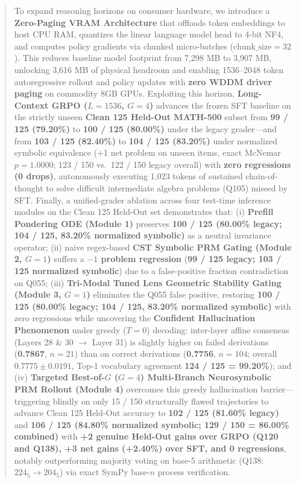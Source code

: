 \documentclass[11pt,a4paper]{article}
\begin{document}
\begin{abstract}
To expand reasoning horizons on consumer hardware, we introduce a \textbf{Zero-Paging VRAM Architecture} that offloads token embeddings to host CPU RAM, quantizes the linear language model head to 4-bit NF4, and computes policy gradients via chunked micro-batches ($\text{chunk\_size}=32$). This reduces baseline model footprint from 7,298 MB to 3,907 MB, unlocking 3,616 MB of physical headroom and enabling 1536--2048 token autoregressive rollout and policy updates with \textbf{zero WDDM driver paging} on commodity 8GB GPUs. Exploiting this horizon, \textbf{Long-Context GRPO ($L=1536$, $G=4$)} advances the frozen SFT baseline on the strictly unseen \textbf{Clean 125 Held-Out MATH-500} subset from \textbf{99 / 125 (79.20\%)} to \textbf{100 / 125 (80.00\%)} under the legacy grader---and from \textbf{103 / 125 (82.40\%)} to \textbf{104 / 125 (83.20\%)} under normalized symbolic equivalence (+1 net problem on unseen items, exact McNemar $p = 1.0000$; 123 / 150 vs.\ 122 / 150 legacy overall) with \textbf{zero regressions (0 drops)}, autonomously executing 1,023 tokens of sustained chain-of-thought to solve difficult intermediate algebra problems (Q105) missed by SFT. Finally, a unified-grader ablation across four test-time inference modules on the Clean 125 Held-Out set demonstrates that: (i) \textbf{Prefill Pondering ODE (Module 1)} preserves \textbf{100 / 125 (80.00\% legacy; 104 / 125, 83.20\% normalized symbolic)} as a neutral invariance operator; (ii) naive regex-based \textbf{CST Symbolic PRM Gating (Module 2, $G=1$)} suffers a \textbf{$-1$ problem regression} (\textbf{99 / 125 legacy; 103 / 125 normalized symbolic}) due to a false-positive fraction contradiction on Q055; (iii) \textbf{Tri-Modal Tuned Lens Geometric Stability Gating (Module 3, $G=1$)} eliminates the Q055 false positive, restoring \textbf{100 / 125 (80.00\% legacy; 104 / 125, 83.20\% normalized symbolic)} with zero regressions while uncovering the \textbf{Confident Hallucination Phenomenon} under greedy ($T=0$) decoding: inter-layer affine consensus (Layers 28 \& 30 $\to$ Layer 31) is slightly higher on failed derivations (\textbf{0.7867}, $n=21$) than on correct derivations (\textbf{0.7756}, $n=104$; overall $0.7775 \pm 0.0191$, Top-1 vocabulary agreement \textbf{124 / 125 = 99.20\%}); and (iv) \textbf{Targeted Best-of-$G$ ($G=4$) Multi-Branch Neurosymbolic PRM Rollout (Module 4)} overcomes this greedy hallucination barrier—triggering blindly on only 15 / 150 structurally flawed trajectories to advance Clean 125 Held-Out accuracy to \textbf{102 / 125 (81.60\% legacy)} and \textbf{106 / 125 (84.80\% normalized symbolic; 129 / 150 = 86.00\% combined)} with \textbf{+2 genuine Held-Out gains over GRPO (Q120 and Q138), +3 net gains (+2.40\%) over SFT, and 0 regressions}, notably outperforming majority voting on base-5 arithmetic (Q138: $224_5 \to 204_5$) via exact SymPy base-$n$ process verification.
\end{abstract}
\end{document}
